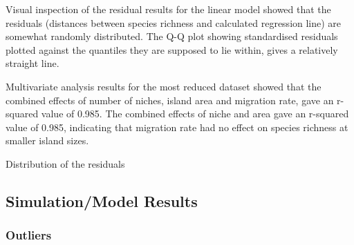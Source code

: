 \documentclass{article}
\begin{document}
Visual inspection of the residual results for the linear model showed that the residuals (distances between species richness and calculated regression line) are somewhat randomly distributed. The Q-Q plot showing standardised residuals plotted against the quantiles they are supposed to lie within, gives a relatively straight line. \bigskip

Multivariate analysis results for the most reduced dataset showed that the combined effects of number of niches, island area and migration rate, gave an r-squared value of 0.985. The combined effects of niche and area gave an r-squared value of 0.985, indicating that migration rate had no effect on species richness at smaller island sizes. \bigskip

Distribution of the residuals 

\subsection{Simulation/Model Results}

\subsubsection{Outliers}
\end{document}
